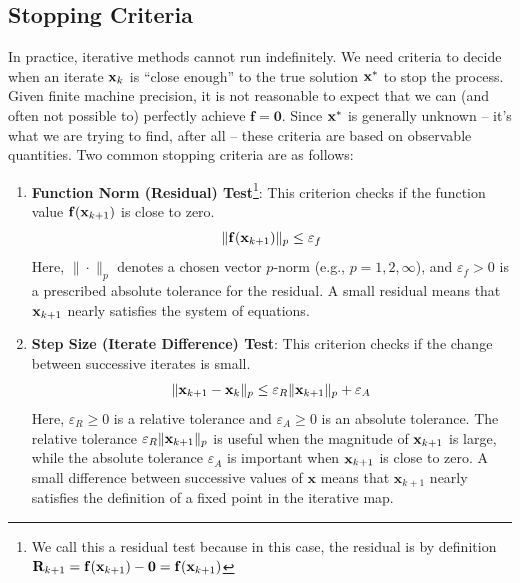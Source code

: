 \subsection{Stopping Criteria}
In practice, iterative methods cannot run indefinitely. We need criteria to decide when an iterate $\mathbf{x}_k$ is ``close enough'' to the true solution $\mathbf{x}^*$ to stop the process. Given finite machine precision, it is not reasonable to expect that we can (and often not possible to) perfectly achieve $\mathbf f = \mathbf 0$. Since $\mathbf{x}^*$ is generally unknown -- it's what we are trying to find, after all -- these criteria are based on observable quantities. Two common stopping criteria are as follows:

\begin{enumerate}
    \item \textbf{Function Norm (Residual) Test}\footnote{We call this a residual test because in this case, the residual is by definition $\mathbf{R}_{k+1} = \mathbf{f}(\mathbf{x}_{k+1}) - \mathbf{0} = \mathbf{f}(\mathbf{x}_{k+1})$}: This criterion checks if the function value $\mathbf{f}(\mathbf{x}_{k+1})$ is close to zero.
    \begin{equation}
        \|\mathbf{f}(\mathbf{x}_{k+1})\|_p \le \varepsilon_f
    \end{equation}
    Here, $\|\cdot\|_p$ denotes a chosen vector $p$-norm (e.g., $p=1, 2, \infty$), and $\varepsilon_f > 0$ is a prescribed absolute tolerance for the residual. A small residual means that $\mathbf{x}_{k+1}$ nearly satisfies the system of equations. 

    \item \textbf{Step Size (Iterate Difference) Test}: This criterion checks if the change between successive iterates is small.
    \begin{equation}
        \|\mathbf{x}_{k+1} - \mathbf{x}_k\|_p \le \varepsilon_R \|\mathbf{x}_{k+1}\|_p + \varepsilon_A
    \end{equation}
    Here, $\varepsilon_R \ge 0$ is a relative tolerance and $\varepsilon_A \ge 0$ is an absolute tolerance. The relative tolerance $\varepsilon_R \|\mathbf{x}_{k+1}\|_p$ is useful when the magnitude of $\mathbf{x}_{k+1}$ is large, while the absolute tolerance $\varepsilon_A$ is important when $\mathbf{x}_{k+1}$ is close to zero. A small difference between successive values of $\mathbf x$ means that $\mathbf x_{k+1}$ nearly satisfies the definition of a fixed point in the iterative map.
\end{enumerate}

